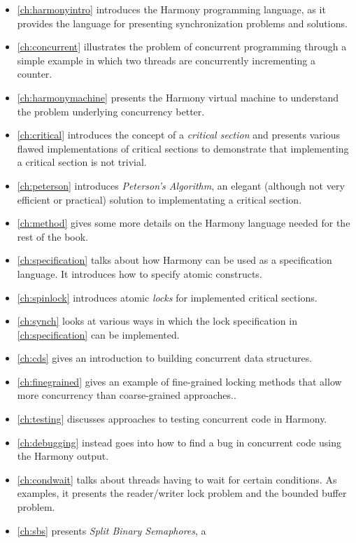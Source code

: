\documentclass{report}
\begin{document}
\begin{itemize}
\item \autoref{ch:harmonyintro} introduces the Harmony programming
language, as it provides the language for presenting synchronization
problems and solutions.
\item \autoref{ch:concurrent} illustrates the problem of
concurrent programming through a simple example in which two threads
are concurrently incrementing a counter.
\item \autoref{ch:harmonymachine} presents the
Harmony virtual machine to understand the problem
underlying concurrency better.
\item \autoref{ch:critical} introduces the concept of a
\emph{critical section} and presents various flawed implementations
of critical sections to demonstrate that implementing a critical section
is not trivial.
\item \autoref{ch:peterson} introduces \emph{Peterson's Algorithm}, an
elegant (although not very efficient or practical) solution to implementating a critical section.
\item \autoref{ch:method} gives some more details on the Harmony
language needed for the rest of the book.
\item \autoref{ch:specification} talks about how Harmony can be used as
a specification language.  It introduces how to specify atomic
constructs.
\item \autoref{ch:spinlock} introduces atomic \emph{locks}
for implemented critical sections.
\item \autoref{ch:synch} looks at various ways in which the lock specification
in \autoref{ch:specification} can be implemented.
\item \autoref{ch:cds} gives an introduction to building concurrent
data structures.
\item \autoref{ch:finegrained} gives an example of fine-grained locking
methods that allow more concurrency than coarse-grained approaches..
\item \autoref{ch:testing} discusses approaches to testing
concurrent code in Harmony.
\item \autoref{ch:debugging} instead goes into how to find a bug
in concurrent code using the Harmony output.
\item \autoref{ch:condwait} talks about threads having to wait for
certain conditions.  As examples, it presents the reader/writer lock
problem and the bounded buffer problem.
\item \autoref{ch:sbs} presents \emph{Split Binary Semaphores}, a

\end{itemize}
\end{document}
